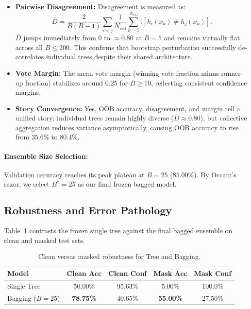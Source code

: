 \documentclass[10pt,twocolumn,letterpaper]{article}
\begin{document}
\begin{itemize}[leftmargin=*]
    \item \textbf{Pairwise Disagreement:} Disagreement is measured as:
    \begin{equation}
        \bar{D} = \frac{2}{B(B-1)} \sum_{i < j} \frac{1}{N_{\text{val}}} \sum_{k=1}^{N_{\text{val}}} \mathbb{I}[h_i(x_k) \neq h_j(x_k)].
    \end{equation}
    $\bar{D}$ jumps immediately from $0$ to $\approx 0.80$ at $B=5$ and remains virtually flat across all $B \le 200$. This confirms that bootstrap perturbation successfully de-correlates individual trees despite their shared architecture.
    \item \textbf{Vote Margin:} The mean vote margin (winning vote fraction minus runner-up fraction) stabilizes around $0.25$ for $B \ge 10$, reflecting consistent confidence margins.
    \item \textbf{Story Convergence:} Yes, OOB accuracy, disagreement, and margin tell a unified story: individual trees remain highly diverse ($\bar{D} \approx 0.80$), but collective aggregation reduces variance asymptotically, causing OOB accuracy to rise from $35.6\%$ to $80.4\%$.
\end{itemize}

\paragraph{Ensemble Size Selection:}
Validation accuracy reaches its peak plateau at $B=25$ ($85.00\%$). By Occam's razor, we select $B^* = 25$ as our final frozen bagged model.

\subsection{Robustness and Error Pathology}
Table~\ref{tab:q1_robustness} contrasts the frozen single tree against the final bagged ensemble on clean and masked test sets.

\begin{table}[h]
\centering
\small
\caption{Clean versus masked robustness for Tree and Bagging.}
\label{tab:q1_robustness}
\begin{tabular}{lcccc}
\toprule
Model & Clean Acc & Clean Conf & Mask Acc & Mask Conf \\
\midrule
Single Tree & 50.00\% & 95.63\% & 5.00\% & 100.0\% \\
Bagging ($B=25$) & \textbf{78.75\%} & 40.65\% & \textbf{55.00\%} & 27.50\% \\
\bottomrule
\end{tabular}
\end{table}
\end{document}
